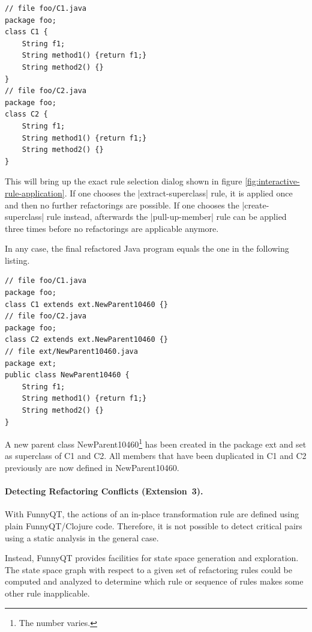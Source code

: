 \documentclass[submission]{eptcs}
\newcommand{\code}{\clojureinline}
\begin{document}
\begin{verbatim}
// file foo/C1.java
package foo;
class C1 {
    String f1;
    String method1() {return f1;}
    String method2() {}
}
// file foo/C2.java
package foo;
class C2 {
    String f1;
    String method1() {return f1;}
    String method2() {}
}
\end{verbatim}

This will bring up the exact rule selection dialog shown in figure
\vref{fig:interactive-rule-application}.  If one chooses the
\code|extract-superclass| rule, it is applied once and then no further
refactorings are possible.  If one chooses the \code|create-superclass| rule
instead, afterwards the \code|pull-up-member| rule can be applied three times
before no refactorings are applicable anymore.

In any case, the final refactored Java program equals the one in the following
listing.

\begin{verbatim}
// file foo/C1.java
package foo;
class C1 extends ext.NewParent10460 {}
// file foo/C2.java
package foo;
class C2 extends ext.NewParent10460 {}
// file ext/NewParent10460.java
package ext;
public class NewParent10460 {
    String f1;
    String method1() {return f1;}
    String method2() {}
}
\end{verbatim}

A new parent class \textsf{NewParent10460}\footnote{The number varies.} has
been created in the package \textsf{ext} and set as superclass of \textsf{C1}
and \textsf{C2}.  All members that have been duplicated in \textsf{C1} and
\textsf{C2} previously are now defined in \textsf{NewParent10460}.


\paragraph{Detecting Refactoring Conflicts (Extension~3).}

With FunnyQT, the actions of an in-place transformation rule are defined using
plain FunnyQT/Clojure code.  Therefore, it is not possible to detect critical
pairs using a static analysis in the general case.

Instead, FunnyQT provides facilities for state space generation and
exploration.  The state space graph with respect to a given set of refactoring
rules could be computed and analyzed to determine which rule or sequence of
rules makes some other rule inapplicable.
\end{document}
